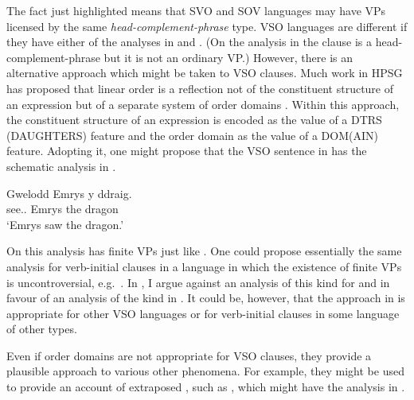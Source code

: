 \documentclass[output=paper]{langsci/langscibook}
\begin{document}
The fact just highlighted means that SVO and SOV languages may have VPs
licensed by the same \emph{head-complement-phrase} type. VSO languages are
different if they have either of the analyses in  and
. (On the analysis in  the clause is a
head-complement-phrase but it is not an ordinary VP.) However, there is an
alternative approach which might be taken to VSO clauses. Much work in
\gls{HPSG} has proposed that linear order is a reflection not of the
constituent structure of an expression but of a separate system of order
domains \parencite[see][]{Reape1992,Muller1996,Kathol2000}.  Within this
approach, the constituent structure of an expression is encoded as the value of
a DTRS (DAUGHTERS) feature and the order domain as the value of a DOM(AIN)
feature. Adopting it, one might propose that the  VSO sentence in
 has the schematic analysis in .

\ea\label{ex:key:4.30}
    \sn\gll Gwelodd      Emrys  y    ddraig.\\
            see.\Pst.\Tsg{} Emrys the dragon\\
    \glt    \enquote*{Emrys saw the dragon.}
\z

\ea\label{ex:key:4.31}
\z
%
On this analysis  has finite VPs just like . One could
propose essentially the same analysis for verb-initial clauses in a language in
which the existence of finite VPs is uncontroversial, e.g.\ . In
\citet{Borsley2006}, I argue against an analysis of this kind for 
and in favour of an analysis of the kind in . It could be,
however, that the approach in  is appropriate for other VSO
languages or for verb-initial clauses in some language of other types.

Even if order domains are not appropriate for  VSO clauses, they
provide a plausible approach to various other phenomena. For example, they
might be used to provide an account of extraposed , such as
, which might have the analysis in .
\end{document}
